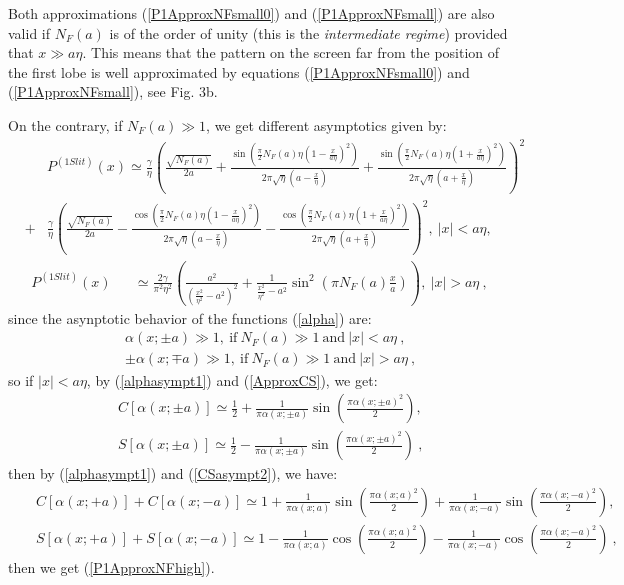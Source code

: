 \documentclass[12pt,aps,prb,preprint]{revtex4-1}   %
\begin{document}
Both approximations (\ref{P1ApproxNFsmall0}) and
(\ref{P1ApproxNFsmall}) are also valid if $N_F(a)$ is of the order
of unity (this is the \textit{intermediate regime}) provided that
$x\gg a\eta$. This means that the pattern on the screen far from
the position of the first lobe is well approximated by  equations
(\ref{P1ApproxNFsmall0}) and (\ref{P1ApproxNFsmall}), see Fig. 3b.

On the contrary, if $N_F(a)\gg 1$, we get different asymptotics
given by:
\begin{eqnarray}\label{P1ApproxNFhigh}
&&P^{(1
Slit)}(x)\simeq\frac{\gamma}{\eta}\left(\frac{\sqrt{N_F(a)}}{2a}+
\frac{\sin{(\frac{\pi}{2}N_F(a)\eta(1-\frac{x}{a\eta})^2)}}{2\pi\sqrt{\eta}(a-\frac{x}{\eta})}
+\frac{\sin{(\frac{\pi}{2}N_F(a)\eta(1+\frac{x}{a\eta})^2)}}{2\pi\sqrt{\eta}(a+\frac{x}{\eta})}\right)^2
{}\nonumber\\{}&+&\frac{\gamma}{\eta}\left(\frac{\sqrt{N_F(a)}}{2a}-
\frac{\cos{(\frac{\pi}{2}N_F(a)\eta(1-\frac{x}{a\eta})^2)}}{2\pi\sqrt{\eta}(a-\frac{x}{\eta})}
-\frac{\cos{(\frac{\pi}{2}N_F(a)\eta(1+\frac{x}{a\eta})^2)}}{2\pi\sqrt{\eta}(a+\frac{x}{\eta})}\right)^2,\ |x|<a\eta,
\end{eqnarray}
\begin{eqnarray}\label{P1ApproxNFhigh2}
P^{(1 Slit)}(x)&&
\simeq\frac{2\gamma}{\pi^2\eta^2}\left(\frac{a^2}{(\frac{x^2}{\eta^2}-a^2)^2}+\frac{1}{\frac{x^2}{\eta^2}-a^2}\sin^2{(\pi
N_F(a) \frac{x}{a})}\right) ,\ |x|>a\eta\ ,
\end{eqnarray}
since the asynptotic behavior of the functions (\ref{alpha}) are:
\begin{eqnarray}
&&\alpha(x;\pm a)\gg1,\ \mathrm{if}\ N_F(a)\gg1\ \mathrm{and}\ |x|<a\eta\ ,\label{alphasympt1}
{}\\{}&& \pm\alpha(x;\mp a)\gg1,\ \mathrm{if}\ N_F(a)\gg1\ \mathrm{and}\ |x|>a\eta\ ,\label{alphasympt2}
\end{eqnarray}
so if $|x|<a\eta$, by (\ref{alphasympt1}) and (\ref{ApproxCS}), we get:
\begin{eqnarray}\label{CSasympt2}
&& C[\alpha(x;\pm a)]\simeq \frac{1}{2} + \frac{1}{\pi\alpha(x;\pm a)}\sin{(\frac{\pi\alpha(x;\pm a)^2}{2})},
{}\nonumber\\{}&& S[\alpha(x;\pm a)]\simeq \frac{1}{2} - \frac{1}{\pi\alpha(x;\pm a)}\sin{(\frac{\pi\alpha(x;\pm a)^2}{2})}\ ,
\end{eqnarray}
then by (\ref{alphasympt1}) and (\ref{CSasympt2}), we have:
\begin{eqnarray*}
&& C[\alpha(x;+a)]+C[\alpha(x;-a)]\simeq 1+\frac{1}{\pi\alpha(x;a)}\sin{(\frac{\pi\alpha(x;a)^2}{2})}
+\frac{1}{\pi\alpha(x;-a)}\sin{(\frac{\pi\alpha(x;-a)^2}{2})},
{}\nonumber\\{}&& S[\alpha(x;+a)]+S[\alpha(x;-a)]\simeq 1-\frac{1}{\pi\alpha(x;a)}\cos{(\frac{\pi\alpha(x;a)^2}{2})}
-\frac{1}{\pi\alpha(x;-a)}\cos{(\frac{\pi\alpha(x;-a)^2}{2})}\ ,
\end{eqnarray*}
then we get (\ref{P1ApproxNFhigh}).
\end{document}
